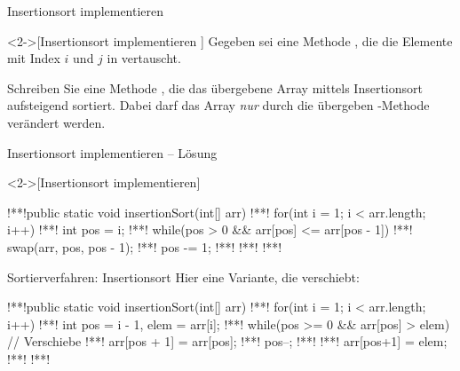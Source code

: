 \ifull
\begin{frame}[c]{Insertionsort implementieren}
    \begin{exercise}<2->[Insertionsort implementieren ]
        \pause{}Gegeben sei eine Methode , die die Elemente mit Index \(i\) und \(j\) in  vertauscht.\medskip\par\pause Schreiben Sie eine Methode , die das übergebene Array mittels Insertionsort aufsteigend sortiert. Dabei darf das Array \emph{nur} durch die übergeben -Methode verändert werden.
    \end{exercise}
\end{frame}

\begin{frame}[fragile,c]{Insertionsort implementieren -- Lösung}
    \begin{solve}<2->[Insertionsort implementieren]
\begin{plainjava}
!**!public static void insertionSort(int[] arr) {
!**!    for(int i = 1; i < arr.length; i++) {
!**!        int pos = i;
!**!        while(pos > 0 && arr[pos] <= arr[pos - 1]) {
!**!            swap(arr, pos, pos - 1);
!**!            pos -= 1;
!**!        }
!**!    }
!**!}
    \end{plainjava}
    \end{solve}
\end{frame}
\fi

\begin{frame}[fragile,c]{Sortierverfahren: Insertionsort}
    \pause Hier eine Variante, die verschiebt:
    \begin{plainjava}
!**!public static void insertionSort(int[] arr) {
!**!    for(int i = 1; i < arr.length; i++) {
!**!        int pos = i - 1, elem = arr[i];
!**!        while(pos >= 0 && arr[pos] > elem) { // Verschiebe
!**!            arr[pos + 1] = arr[pos];
!**!            pos--;
!**!        }
!**!        arr[pos+1] = elem;
!**!    }
!**!}
    \end{plainjava}
\end{frame}


\def\List#1#2{
\foreach[count=\i,remember=\i as \li(initially 0)] \n in {#1}{
    \ifnum\i<#2
        \node[inner sep=4pt,ball,outer sep=2pt] (\i) at(1.25*\i,0) {\n};
    \else
        \node[inner sep=4pt,iball,outer sep=2pt] (\i) at(1.25*\i,0) {\n};
    \fi
    \ifnum\i>1
        \draw (\li.east) -- (\i.west);
    \fi
}}

